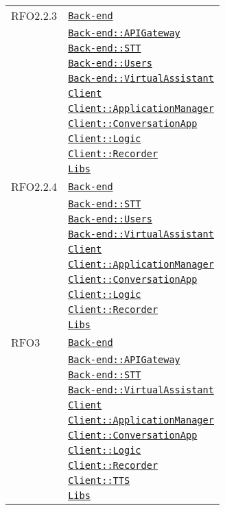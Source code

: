 \begin{longtable}{|>{\centering}m{3cm}|m{10cm}<{\centering}|}
RFO2.2.3 & \hyperref[Back-end]{\texttt{Back-end}}\\
& \hyperref[Back-end::APIGateway]{\texttt{Back-end::APIGateway}}\\
& \hyperref[Back-end::STT]{\texttt{Back-end::STT}}\\
& \hyperref[Back-end::Users]{\texttt{Back-end::Users}}\\
& \hyperref[Back-end::VirtualAssistant]{\texttt{Back-end::VirtualAssistant}}\\
& \hyperref[Client]{\texttt{Client}}\\
& \hyperref[Client::ApplicationManager]{\texttt{Client::ApplicationManager}}\\
& \hyperref[Client::ConversationApp]{\texttt{Client::ConversationApp}}\\
& \hyperref[Client::Logic]{\texttt{Client::Logic}}\\
& \hyperref[Client::Recorder]{\texttt{Client::Recorder}}\\
& \hyperref[Libs]{\texttt{Libs}}\\ \hline

RFO2.2.4 & \hyperref[Back-end]{\texttt{Back-end}}\\
& \hyperref[Back-end::STT]{\texttt{Back-end::STT}}\\
& \hyperref[Back-end::Users]{\texttt{Back-end::Users}}\\
& \hyperref[Back-end::VirtualAssistant]{\texttt{Back-end::VirtualAssistant}}\\
& \hyperref[Client]{\texttt{Client}}\\
& \hyperref[Client::ApplicationManager]{\texttt{Client::ApplicationManager}}\\
& \hyperref[Client::ConversationApp]{\texttt{Client::ConversationApp}}\\
& \hyperref[Client::Logic]{\texttt{Client::Logic}}\\
& \hyperref[Client::Recorder]{\texttt{Client::Recorder}}\\
& \hyperref[Libs]{\texttt{Libs}}\\ \hline

RFO3 & \hyperref[Back-end]{\texttt{Back-end}}\\
& \hyperref[Back-end::APIGateway]{\texttt{Back-end::APIGateway}}\\
& \hyperref[Back-end::STT]{\texttt{Back-end::STT}}\\
& \hyperref[Back-end::VirtualAssistant]{\texttt{Back-end::VirtualAssistant}}\\
& \hyperref[Client]{\texttt{Client}}\\
& \hyperref[Client::ApplicationManager]{\texttt{Client::ApplicationManager}}\\
& \hyperref[Client::ConversationApp]{\texttt{Client::ConversationApp}}\\
& \hyperref[Client::Logic]{\texttt{Client::Logic}}\\
& \hyperref[Client::Recorder]{\texttt{Client::Recorder}}\\
& \hyperref[Client::TTS]{\texttt{Client::TTS}}\\
& \hyperref[Libs]{\texttt{Libs}}\\ \hline


\end{longtable}
